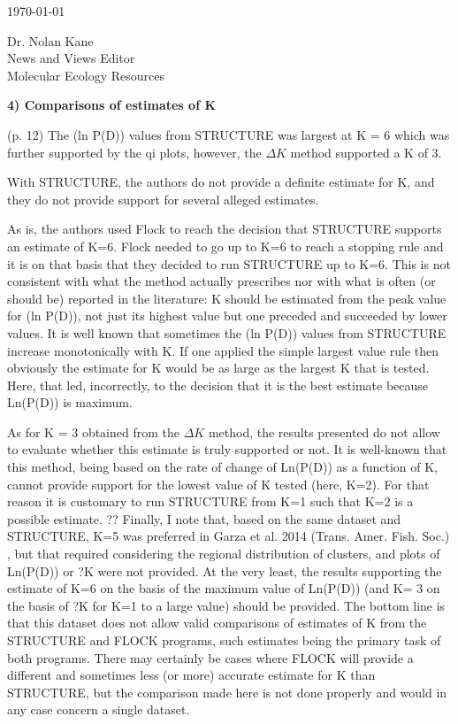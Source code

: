 \documentclass[11pt]{letter}
\begin{document}
\begin{letter}{ \today 

Dr. Nolan Kane\\
News and Views Editor\\
Molecular Ecology Resources \\
}
{\bf 4) Comparisons of estimates of K}

(p. 12) The (ln P(D)) values from STRUCTURE was largest at K = 6 which was further supported by
the qi plots, however, the $\Delta K$ method supported a K of 3.

With STRUCTURE, the authors do not provide a definite estimate for K, and they do not provide support for several alleged estimates.

As is, the authors used Flock to reach the decision that STRUCTURE supports an estimate of K=6. Flock needed to go up to K=6 to reach a stopping rule and it is on that basis that they decided to run STRUCTURE up to K=6. This is not consistent with what the method actually prescribes nor with what is often (or should be) reported in the literature: K should be estimated from the peak value for (ln P(D)), not just its highest value but one preceded and succeeded by lower values. It is well known that sometimes the (ln P(D)) values from STRUCTURE increase monotonically with K. If one applied the simple largest value rule then obviously the estimate for K would be as large as the largest K that is tested. Here, that led, incorrectly, to the decision that it is the best estimate because Ln(P(D)) is maximum.

As for K = 3 obtained from the $\Delta K$ method, the results presented do not allow to evaluate whether this estimate is truly supported or not. It is well-known that this method, being based on the rate of change of Ln(P(D)) as a function of K, cannot provide support for the lowest value of K tested (here, K=2). For that reason it is customary to run STRUCTURE from K=1 such that K=2 is a possible estimate.
??
Finally, I note that, based on the same dataset and STRUCTURE, K=5 was preferred in Garza et al. 2014 (Trans. Amer. Fish. Soc.) , but that required considering the regional distribution of clusters, and plots of Ln(P(D)) or ?K were not provided.
At the very least, the results supporting the estimate of K=6 on the basis of the maximum value of Ln(P(D)) (and K= 3 on the basis of ?K for K=1 to a large value) should be provided.
The bottom line is that this dataset does not allow valid comparisons of estimates of K from the STRUCTURE and FLOCK programs, such estimates being the primary task of both programs. There may certainly be cases where FLOCK will provide a different and sometimes less (or more) accurate estimate for K than STRUCTURE, but the comparison made here is not done properly and would in any case concern a single dataset.


\end{letter}
\end{document}
